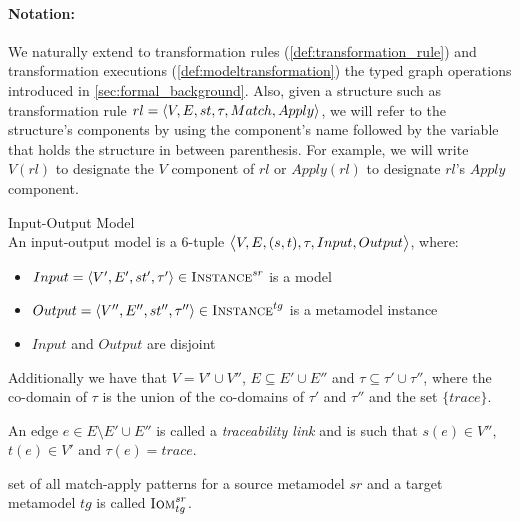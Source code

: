 \paragraph{\textbf{Notation:}}


We naturally extend to transformation rules (\cref{def:transformation_rule}) and transformation executions (\cref{def:modeltransformation}) the typed graph operations introduced in \cref{sec:formal_background}.  Also, given a structure such as transformation rule $rl = \langle V,E,st,\tau,Match,\\Apply\rangle$, we will refer to the structure's components by using the component's name followed by the variable that holds the structure in between parenthesis. For example, we will write $V(rl)$ to designate the $V$ component of $rl$ or $Apply(rl)$ to designate $rl$'s $Apply$ component.



\begin{definition}{Input-Output Model\\}
\label{def:input_output_model}
An input-output model is a 6-tuple $\big\langle V,E,(s,t),\tau,Input,\\Output\big\rangle$, where:
\begin{itemize}
\item $Input=\langle V',E',st',\tau'\rangle\in \textsc{Instance}^{sr}$ is a model
\item $Output=\langle V'',E'',st'',\tau''\rangle\in \textsc{Instance}^{tg}$ is a metamodel instance
\item $Input$ and $Output$ are disjoint
\end{itemize}

Additionally we have that $V=V'\cup V''$, $E\subseteq E'\cup E''$ and $\tau\subseteq \tau'\cup \tau''$, where the co-domain of $\tau$ is the union of the co-domains of $\tau'$ and $\tau''$ and the set $\{trace\}$.

An edge $e \in E\setminus E'\cup E''$ is called a \emph{traceability link} and is such that $s(e)\in V''$, $t(e)\in V'$ and $\tau(e)=trace$. 

 set of all match-apply patterns for a source metamodel $sr$ and a target metamodel $tg$ is called $\textsc{Iom}^{sr}_{tg}$.
\end{definition}

